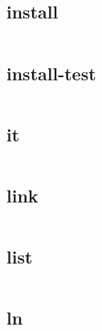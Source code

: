 \subsection{install}


\begin{lstlisting}[language=bash]

\end{lstlisting}

\subsection{install-test}


\begin{lstlisting}[language=bash]

\end{lstlisting}

\subsection{it}


\begin{lstlisting}[language=bash]

\end{lstlisting}

\subsection{link}


\begin{lstlisting}[language=bash]

\end{lstlisting}

\subsection{list}


\begin{lstlisting}[language=bash]

\end{lstlisting}

\subsection{ln}



\begin{lstlisting}[language=bash]

\end{lstlisting}

